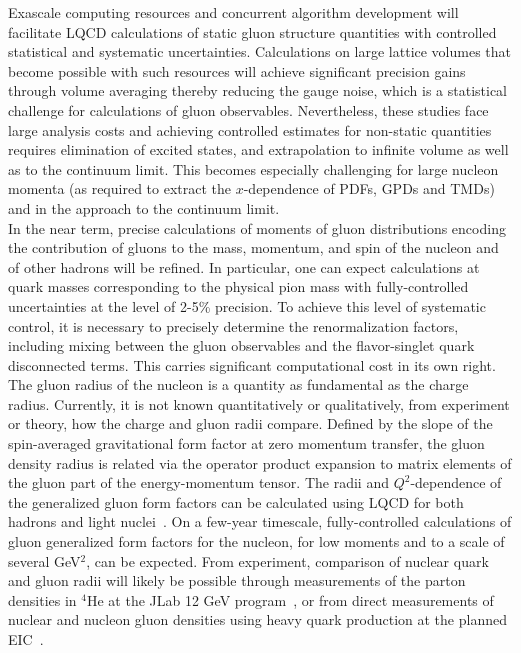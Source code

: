 Exascale computing resources and concurrent algorithm development will facilitate LQCD calculations of static gluon structure quantities with controlled statistical and systematic uncertainties. Calculations on  large lattice volumes that become possible with such resources  will achieve significant precision gains through volume averaging thereby reducing the gauge noise, which is a statistical challenge for calculations of gluon observables. Nevertheless, these studies face large analysis costs and achieving controlled estimates for non-static quantities requires elimination of excited states, and extrapolation to infinite volume as well as to the continuum limit. 
This becomes especially challenging for large nucleon momenta (as required to extract the $x$-dependence of PDFs, GPDs and TMDs) and in the approach to the continuum limit. \\
%
In the near term, precise calculations of moments of gluon distributions encoding the contribution of gluons to the mass, momentum, and spin of the nucleon and of other hadrons will be refined. In particular, one can expect calculations at quark masses corresponding to the physical pion mass with fully-controlled uncertainties at the level of 2-5\% precision. To achieve this level of systematic control, it is necessary to precisely determine the renormalization factors, including mixing between the gluon observables and the flavor-singlet quark disconnected terms. This carries significant computational cost in its own right.\\
 


The gluon radius of the nucleon is a quantity as fundamental as the charge radius. Currently, it is not known quantitatively or qualitatively, from experiment or theory, how the charge and gluon radii compare. 
Defined by the slope of the spin-averaged gravitational form factor at zero momentum transfer, the gluon density radius is related via the operator product expansion to matrix elements of the gluon part of the energy-momentum tensor.
The radii and $Q^2$-dependence of the generalized gluon form factors can be calculated using LQCD for both hadrons and light nuclei~\cite{Detmold:2017oqb,Winter:2017bfs}.
On a few-year timescale, fully-controlled calculations of gluon generalized form factors for the nucleon, for low moments and to a scale of several GeV$^2$, can be expected.
From experiment, comparison of nuclear quark and gluon radii will likely be possible through measurements of the parton densities in ${}^4$He at the JLab 12 GeV program~\cite{Hattawy:2017woc}, or from direct measurements of nuclear and nucleon gluon densities using heavy quark production at the planned EIC~\cite{Chudakov:2016otl}. \\


